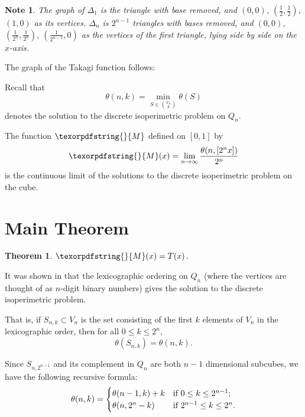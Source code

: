 \documentclass[12pt]{ucthesis}
\theoremstyle{plain}
\newtheorem{theorem}{Theorem}
\newtheorem*{note}{Note}
\theoremstyle{definition}
\newcommand{\takagi}{
  \texorpdfstring{\protect}{M}
}
\begin{document}
\begin{note}
The graph of $\Delta_1$ is the triangle with base removed,
and $(0, 0)$, $(\frac{1}{2}, \frac{1}{2})$, $(1, 0)$ as its vertices.
$\Delta_n$ is $2^{n - 1}$ triangles with bases removed,
and $(0, 0)$, $(\frac{1}{2^n}, \frac{1}{2^n})$, $(\frac{1}{2^{n - 1}}, 0)$
as the vertices of the first triangle, lying side by side on the $x$-axis.
\end{note}

The graph of the Takagi function follows:
\begin{figure}[h!]
	\centering
	
\end{figure}

Recall that
\begin{equation*}
\theta(n, k) = \min_{S \in \binom{V_n}{k}} \theta(S)
\end{equation*}
denotes the solution to the discrete isoperimetric problem on $Q_n$.

The function $\takagi$ defined on $[0, 1]$ by
\begin{equation*}
\takagi(x) = \lim_{n \rightarrow \infty} \frac{\theta(n, [2^n x])}{2^n}
\end{equation*}
is the continuous limit of the solutions to the discrete isoperimetric problem on the cube.

\section{Main Theorem}
\label{Section 3.2}

\begin{theorem}
\label{Theorem 1}
$\takagi(x) = T(x)$.
\end{theorem}

It was shown in \cite{Harper.1964} that the lexicographic ordering on $Q_n$
(where the vertices are thought of as $n$-digit binary numbers)
gives the solution to the discrete isoperimetric problem.

That is, if $S_{n, k} \subset V_n$ is the set consisting of the first $k$ elements of $V_n$
in the lexicographic order, then for all $0 \le k \le 2^n$,
\begin{equation*}
\theta(S_{n, k}) = \theta(n, k).
\end{equation*}

Since $S_{n, 2^{n - 1}}$ and its complement in $Q_n$ are both $n - 1$ dimensional subcubes,
we have the following recursive formula:
\begin{equation}
\label{Equation 3.1}
\theta(n, k) = \begin{cases}
	\theta(n - 1, k) + k & \textnormal{if } 0 \le k \le 2^{n - 1}; \\
	\theta(n, 2^n - k) & \textnormal{if } 2^{n - 1} \le k \le 2^n.
\end{cases}
\end{equation}
\end{document}
